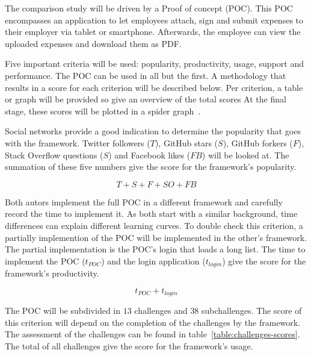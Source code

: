\documentclass[a4paper]{artikel3}
\newcommand{\setspace}[0]{\vspace{2mm}}
\renewcommand{\paragraph}[1]{\setspace \noindent {\bf #1}  }
\begin{document}
The comparison study will be driven by a Proof of concept (POC).  
This POC encompasses an application to let employees attach, sign and submit expenses to their employer via tablet or smartphone.
Afterwards, the employee can view the uploaded expenses and download them as PDF.

Five important criteria will be used:  popularity,  productivity,  usage,  support and performance. 
The POC can be used in all but the first.   
A methodology that results in a score for each criterion will be described below.  
Per criterion,  a table or graph will be provided so give an overview of the total scores
At the final stage,  these scores will be plotted in a spider graph~\cite{Few2005}.   


\paragraph{Popularity}
Social networks provide a good indication to determine the popularity that goes with the framework.  
Twitter followers ($T$),  GitHub stars ($S$),  GitHub forkers ($F$),  Stack Overflow questions ($S$) and Facebook likes ($FB$) will be looked at.
The summation of these five numbers give the score for the framework's popularity.  

\begin{equation}
  T+S+F+SO+FB
  \label{eq:populariteit}
\end{equation}

\paragraph{Productivity}
Both autors implement the full POC in a different framework and carefully record the time to implement it.  
As both start with a similar background,  time differences can explain different learning curves.  
To double check this criterion,  a partially implemention of the POC will be implemented in the other's framework.  
The partial implementation is the POC's login that loads a long list.%
The time to implement the POC ($t_{POC}$) and the login application ($t_{login}$) give the score for the framework's productivity. 

\begin{equation}
  {t_{POC} + t_{login}}
  \label{eq:productiviteit}
\end{equation}

\paragraph{Usage}
The POC will be subdivided in $13$ challenges and $38$ subchallenges.  
The score of this criterion will depend on the completion of the challenges by the framework.  
The assessment of the challenges can be found in table~\ref{table:challenges-scores}.  
The total of all challenges give the score for the framework's usage.
\end{document}
